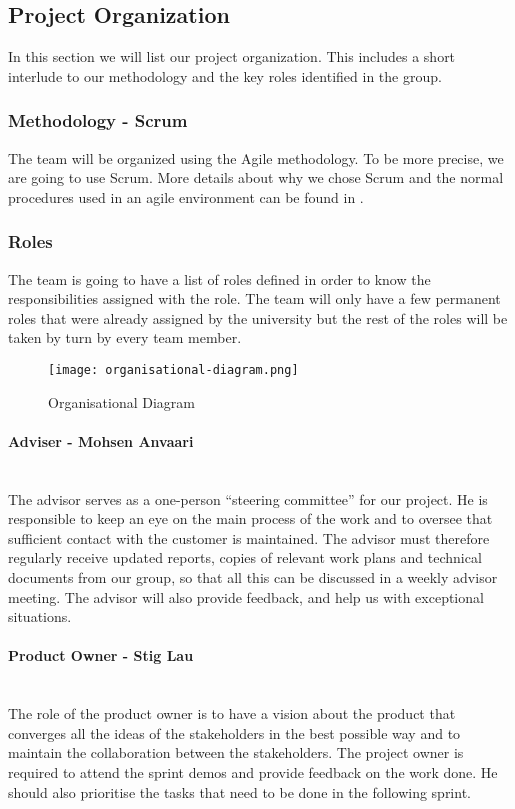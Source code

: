\documentclass[../document.tex]{subfiles}
\begin{document}
\subsection{Project Organization}
In this section we will list our project organization. This includes a short interlude to our methodology and the key roles identified in the group.

\subsubsection{Methodology - Scrum}
The team will be organized using the Agile methodology. To be more precise, we are going to use Scrum. More details about why we chose Scrum and the normal procedures used in an agile environment can be found in .

\subsubsection{Roles}
The team is going to have a list of roles defined in order to know the responsibilities assigned with the role. The team will only have a few permanent roles that were already assigned by the university but the rest of the roles will be taken by turn by every team member. 
\begin{figure}
\centering
\texttt{[image: organisational-diagram.png]}
\caption{Organisational Diagram}
\end{figure}

\paragraph{Adviser - Mohsen Anvaari} \ \\
The advisor serves as a one-person “steering committee” for our project. He is responsible to keep an eye on the main process of the work and to oversee that sufficient contact with the customer is maintained. The advisor must therefore regularly receive updated reports, copies of relevant work plans and technical documents from our group, so that all this can be discussed in a weekly advisor meeting. The advisor will also provide feedback, and help us with exceptional situations.


\paragraph{Product Owner - Stig Lau} \ \\
The role of the product owner is to have a vision about the product that converges all the ideas of the stakeholders in the best possible way and to maintain the collaboration between the stakeholders. The project owner is required to attend the sprint demos and provide feedback on the work done. He should also prioritise the tasks that need to be done in the following sprint. 
\end{document}
